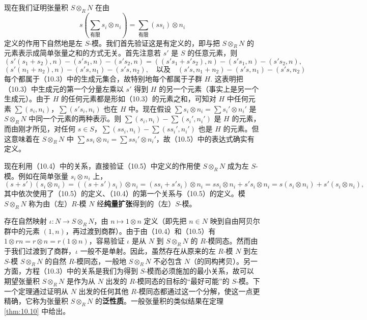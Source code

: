 现在我们证明张量积 \(S \otimes_R N\) 在由
\begin{equation}
s\left(\sum_{\text{有限}} s_i \otimes n_i\right) = \sum_{\text{有限}} (ss_i) \otimes n_i \tag{10.5}
\end{equation}
定义的作用下自然地是左 \(S\)-模。我们首先验证这是有定义的，即与把 \(S \otimes_R N\) 的元素表示成简单张量之和的方式无关。首先注意若 \(s'\) 是 \(S\) 的任意元素，则
\[
(s'(s_1+s_2), n)-(s's_1, n)-(s's_2, n) = ((s's_1+s's_2), n)-(s's_1, n)-(s's_2, n),
\]
\[
(s'(n_1+n_2), n)-(s's, n_1)-(s's, n_2), \quad \text{以及} \quad (s's, n_1+n_2)-(s's, n_1)-(s's, n_2)
\]
每个都属于（10.3）中的生成元集合，故特别地每个都属于子群 \(H\). 这表明把（10.3）中生成元的第一个分量左乘以 \(s'\) 得到 \(H\) 的另一个元素（事实上是另一个生成元）。由于 \(H\) 的任何元素都是形如（10.3）的元素之和，可知对 \(H\) 中任何元素 \(\sum (s_i, n_i)\)，\(\sum (s's_i, n_i)\) 也在 \(H\) 中。现在假设 \(\sum s_i \otimes n_i = \sum s_i' \otimes n_i'\) 是 \(S \otimes_R N\) 中同一个元素的两种表示。则 \(\sum (s_i, n_i)-\sum (s_i', n_i')\) 是 \(H\) 的元素，而由刚才所见，对任何 \(s \in S\)，\(\sum (ss_i, n_i)-\sum (ss_i', n_i')\) 也是 \(H\) 的元素。但这意味着在 \(S \otimes_R N\) 中 \(\sum ss_i \otimes n_i = \sum ss_i' \otimes n_i'\)，故（10.5）中的表达式确实有定义。

现在利用（10.4）中的关系，直接验证（10.5）中定义的作用使 \(S \otimes_R N\) 成为左 \(S\)-模。例如在简单张量 \(s_i \otimes n_i\) 上，
\[
(s+s')(s_i \otimes n_i) = ((s+s')s_i) \otimes n_i = (ss_i+s's_i) \otimes n_i = ss_i \otimes n_i + s's_i \otimes n_i = s(s_i \otimes n_i)+s'(s_i \otimes n_i),
\]
其中依次使用了（10.5）的定义、（10.4）的第一个关系与（10.5）的定义。模 \(S \otimes_R N\) 称为由（左）\(R\)-模 \(N\) 经\textbf{纯量扩张}得到的（左）\(S\)-模。

存在自然映射 \(\iota : N \to S \otimes_R N\)，由 \(n \mapsto 1 \otimes n\) 定义（即先把 \(n \in N\) 映到自由阿贝尔群中的元素 \((1, n)\)，再过渡到商群）。由于由（10.4）和（10.5）有 \(1 \otimes rn = r \otimes n = r(1 \otimes n)\)，容易验证 \(\iota\) 是从 \(N\) 到 \(S \otimes_R N\) 的 \(R\)-模同态。然而由于我们过渡到了商群，\(\iota\) 一般不是单射。因此，虽然存在从原来的左 \(R\)-模 \(N\) 到左 \(S\)-模 \(S \otimes_R N\) 的自然 \(R\)-模同态，一般地 \(S \otimes_R N\) 不必包含 \(N\)（的同构拷贝）。另一方面，方程（10.3）中的关系是我们为得到 \(S\)-模而必须施加的最小关系，故可以期望张量积 \(S \otimes_R N\) 是作为从 \(N\) 出发的 \(R\)-模同态的目标的“最好可能”的 \(S\)-模。下一个定理通过证明从 \(N\) 出发的任何其他 \(R\)-模同态都通过这一个分解，使这一点更精确，它称为张量积 \(S \otimes_R N\) 的\textbf{泛性质}。一般张量积的类似结果在定理 \ref{thm:10.10} 中给出。

